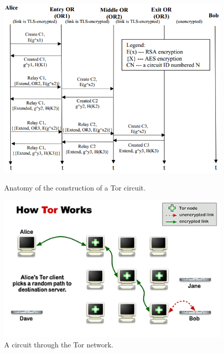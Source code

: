 \begin{figure}[htdp]
	\begin{minipage}[b]{0.45\linewidth}
		\centering
		\includegraphics[width=\textwidth]{images/circuit-construction.png}
		\caption{Anatomy of the construction of a Tor circuit.}
		\label{fig:figure1}
	\end{minipage}
	\hspace{0.5cm}
	\begin{minipage}[b]{0.45\linewidth}
		\centering
		\includegraphics[width=\textwidth]{images/circuit-building-2-5.png}
		\caption{A circuit through the Tor network.}
		\label{fig:figure2}
	\end{minipage}
\end{figure}

